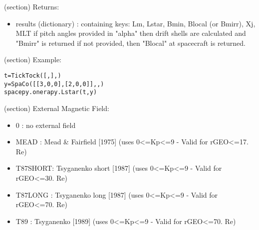 \begin{boxedminipage}{\funcwidth}
\begin{itemize}
      \end{itemize}

    (section) Returns:

      \begin{itemize}
      \setlength{\parskip}{0.6ex}
        \item results (dictionary) : containing keys: Lm, Lstar, Bmin, Blocal 
          (or Bmirr), Xj, MLT if pitch angles provided in "alpha" then 
          drift shells are calculated and "Bmirr" is returned if not 
          provided, then "Blocal" at spacecraft is returned.

      \end{itemize}

    (section) Example:

\begin{alltt}
\pysrcprompt{{\textgreater}{\textgreater}{\textgreater} }t = TickTock([, ], )
\pysrcprompt{{\textgreater}{\textgreater}{\textgreater} }y = SpaCo([[3,0,0],[2,0,0]], , )
\pysrcprompt{{\textgreater}{\textgreater}{\textgreater} }spacepy.onerapy.Lstar(t,y)
\end{alltt}
    (section) External Magnetic Field:

      \begin{itemize}
      \setlength{\parskip}{0.6ex}
        \item 0    : no external field

        \item MEAD  : Mead \& Fairfield [1975] (uses 
          0{\textless}=Kp{\textless}=9 - Valid for rGEO{\textless}=17. Re)

        \item T87SHORT: Tsyganenko short [1987] (uses 
          0{\textless}=Kp{\textless}=9 - Valid for rGEO{\textless}=30. Re)

        \item T87LONG : Tsyganenko long [1987] (uses 
          0{\textless}=Kp{\textless}=9 - Valid for rGEO{\textless}=70. Re)

        \item T89    : Tsyganenko [1989] (uses 0{\textless}=Kp{\textless}=9 - 
          Valid for rGEO{\textless}=70. Re)


\end{itemize}
\end{boxedminipage}
